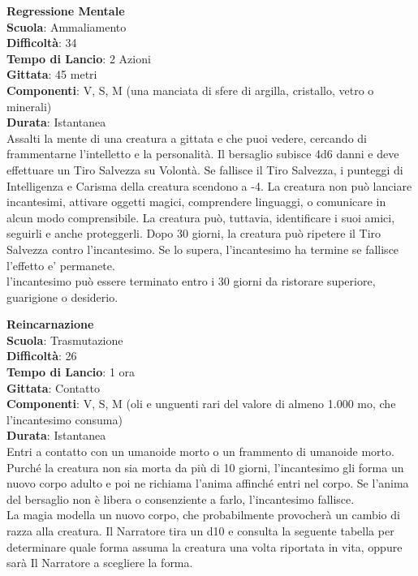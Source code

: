 \begin{multicols}{2}
\medskip\textbf{Regressione Mentale}\\
\textbf{Scuola}: Ammaliamento\\
\textbf{Difficoltà}: 34\\
\textbf{Tempo di Lancio}: 2 Azioni\\
\textbf{Gittata}: 45 metri\\
\textbf{Componenti}: V, S, M (una manciata di sfere di argilla, cristallo, vetro o minerali)\\
\textbf{Durata}: Istantanea\\
Assalti la mente di una creatura a gittata e che puoi vedere, cercando di frammentarne l'intelletto e la personalità. Il bersaglio subisce 4d6 danni e deve effettuare un Tiro Salvezza su Volontà. Se fallisce il Tiro Salvezza, i punteggi di Intelligenza e Carisma della creatura scendono a -4. La creatura non può lanciare incantesimi, attivare oggetti magici, comprendere linguaggi, o comunicare in alcun modo comprensibile. La creatura può, tuttavia, identificare i suoi amici, seguirli e anche proteggerli. Dopo 30 giorni, la creatura può ripetere il Tiro Salvezza contro l'incantesimo. Se lo supera, l'incantesimo ha termine se fallisce l'effetto e' permanete.\\ 
l'incantesimo può essere terminato entro i 30 giorni da ristorare superiore, guarigione o desiderio.

\medskip\textbf{Reincarnazione}\\
\textbf{Scuola}: Trasmutazione\\
\textbf{Difficoltà}: 26\\
\textbf{Tempo di Lancio}: 1 ora\\
\textbf{Gittata}: Contatto\\
\textbf{Componenti}: V, S, M (oli e unguenti rari del valore di almeno 1.000 mo, che l'incantesimo consuma)\\
\textbf{Durata}: Istantanea\\
Entri a contatto con un umanoide morto o un frammento di umanoide morto. Purché la creatura non sia morta da più di 10 giorni, l'incantesimo gli forma un nuovo corpo adulto e poi ne richiama l'anima affinché entri nel corpo. Se l'anima del bersaglio non è libera o consenziente a farlo, l'incantesimo fallisce.\\
La magia modella un nuovo corpo, che probabilmente provocherà un cambio di razza alla creatura. Il Narratore tira un d10 e consulta la seguente tabella per determinare quale forma assuma la creatura una volta riportata in vita, oppure sarà Il Narratore a scegliere la forma.\\


\end{multicols}
